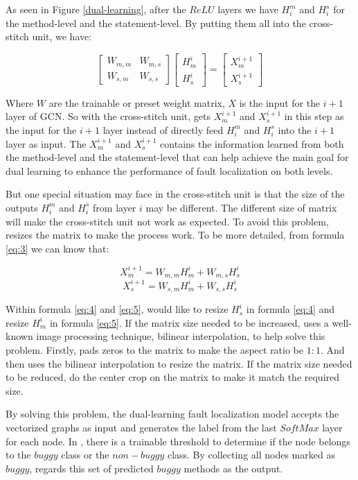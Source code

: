 As seen in Figure \ref{dual-learning}, after the $ReLU$ layers we have $H_i^m$ and $H_i^s$ for the method-level and the statement-level. By putting them all into the cross-stitch unit, we have:

\begin{equation}\label{eq:3}
	\begin{bmatrix}
		W_{m,m} &  W_{m,s} \\
		W_{s,m} &  W_{s,s}
	\end{bmatrix}
	\begin{bmatrix}
		H_m^{i}\\
		H_s^{i}
	\end{bmatrix}=
	\begin{bmatrix}
		X_m^{i+1}\\
		X_s^{i+1}
	\end{bmatrix}
\end{equation}

Where $W$ are the trainable or preset weight matrix, $X$ is the input for the $i+1$ layer of GCN. So with the cross-stitch unit, \tool gets $X_m^{i+1}$ and $X_s^{i+1}$ in this step as the input for the $i+1$ layer instead of directly feed $H_i^m$ and $H_i^s$ into the $i+1$ layer as input. The $X_m^{i+1}$ and $X_s^{i+1}$ contains the information learned from both the method-level and the statement-level that can help achieve the main goal for dual learning to enhance the performance of fault localization on both levels.

But one special situation \tool may face in the cross-stitch unit is that the size of the outputs $H_i^m$ and $H_i^s$ from layer $i$ may be different. The different size of matrix will make the cross-stitch unit not work as expected. To avoid this problem, \tool resizes the matrix to make the process work. To be more detailed, from formula \ref{eq:3} we can know that:

\begin{equation}\label{eq:4}
	X_m^{i+1} = W_{m,m}H_m^{i} + W_{m,s}H_s^{i}
\end{equation}
\begin{equation}\label{eq:5}
	X_s^{i+1} = W_{s,m}H_m^{i} + W_{s,s}H_s^{i}
\end{equation}

Within formula \ref{eq:4} and \ref{eq:5}, \tool would like to resize $H_s^{i}$ in formula \ref{eq:4} and resize $H_m^{i}$ in formula \ref{eq:5}. If the matrix size needed to be increased, \tool uses a well-known image processing technique, bilinear interpolation, to help solve this problem. Firstly, \tool pads zeros to the matrix to make the aspect ratio be $1:1$. And then \tool uses the bilinear interpolation to resize the matrix. If the matrix size needed to be reduced, \tool do the center crop on the matrix to make it match the required size.

By solving this problem, the dual-learning fault localization model accepts the vectorized graphs as input and generates the label from the last $SoftMax$ layer for each node. In \tool, there is a trainable threshold to determine if the node belongs to the $buggy$ class or the $non-buggy$ class. By collecting all nodes marked as $buggy$, \tool regards this set of predicted $buggy$ methods as the output. 

